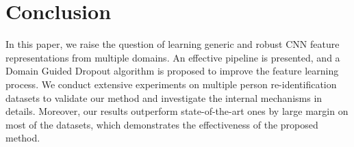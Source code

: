 




\section{Conclusion} %
\label{sec:md-conclusion}

In this paper, we raise the question of learning generic and robust CNN feature representations from multiple domains. An effective pipeline is presented, and a Domain Guided Dropout algorithm is proposed to improve the feature learning process. We conduct extensive experiments on multiple person re-identification datasets to validate our method and investigate the internal mechanisms in details. Moreover, our results outperform state-of-the-art ones by large margin on most of the datasets, which demonstrates the effectiveness of the proposed method.